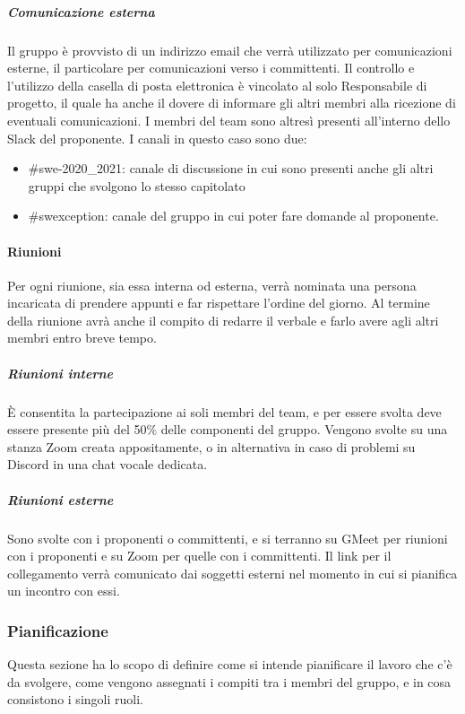 \subparagraph{Comunicazione esterna}
Il gruppo è provvisto di un indirizzo email che verrà utilizzato per comunicazioni esterne, il particolare per comunicazioni verso i committenti. Il controllo e l'utilizzo della casella di posta elettronica è vincolato al solo Responsabile di progetto, il quale ha anche il dovere di informare gli altri membri alla ricezione di eventuali comunicazioni.
I membri del team sono altresì presenti all'interno dello Slack del proponente. I canali in questo caso sono due:
\begin{itemize}
    \item {\#swe-2020\_2021:} canale di discussione in cui sono presenti anche gli altri gruppi che svolgono lo stesso capitolato
    \item {\#swexception:} canale del gruppo in cui poter fare domande al proponente.
\end{itemize}

\paragraph{Riunioni}
Per ogni riunione, sia essa interna od esterna, verrà nominata una persona incaricata di prendere appunti e far rispettare l'ordine del giorno. Al termine della riunione avrà anche il compito di redarre il verbale e farlo avere agli altri membri entro breve tempo.
\subparagraph{Riunioni interne}
È consentita la partecipazione ai soli membri del team, e per essere svolta deve essere presente più del 50\% delle componenti del gruppo. Vengono svolte su una stanza Zoom creata appositamente, o in alternativa in caso di problemi su Discord in una chat vocale dedicata.
\subparagraph{Riunioni esterne}
Sono svolte con i proponenti o committenti, e si terranno su GMeet per riunioni con i proponenti e su Zoom per quelle con i committenti. Il link per il collegamento verrà comunicato dai soggetti esterni nel momento in cui si pianifica un incontro con essi.

\subsubsection{Pianificazione}
Questa sezione ha lo scopo di definire come si intende pianificare il lavoro che c'è da svolgere, come vengono assegnati i compiti tra i membri del gruppo, e in cosa consistono i singoli ruoli.

